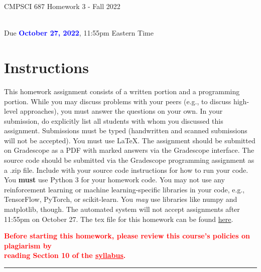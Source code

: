 \documentclass{article}
\newcommand{\TODO}[1]{\textcolor{blue}{\textbf{{#1}}}}
\newcommand{\WARNING}[1]{\textcolor{red}{\textbf{{#1}}}}
\begin{document}
\newpage
\begin{center}
    \begin{Large}
    CMPSCI 687 Homework 3 - Fall 2022 
    \end{Large}
    \\
    Due \TODO{October 27, 2022}, 11:55pm Eastern Time
\end{center}

\vspace{0.25in}

\section{Instructions}

This homework assignment consists of a written portion and a programming portion. While you may discuss problems with your peers (e.g., to discuss high-level approaches), you must answer the questions on your own. In your submission, do explicitly list all students with whom you discussed this assignment. Submissions must be typed (handwritten and scanned submissions will not be accepted). You must use \LaTeX. The assignment should be submitted on Gradescope as a PDF with marked answers via the Gradescope interface. The source code should be submitted via the Gradescope programming assignment as a .zip file. Include with your source code instructions for how to run your code. You \textbf{must} use Python 3 for your homework code. You may not use any reinforcement learning or machine learning-specific libraries in your code, e.g., TensorFlow, PyTorch, or scikit-learn. You \textit{may} use libraries like numpy and matplotlib, though. The automated system will not accept assignments after 11:55pm on October 27. The tex file for this homework can be found \href{https://people.cs.umass.edu/~bsilva/courses/CMPSCI_687/Fall2022/HWs/HW3_Source.zip}{here}.

\begin{center}
    \WARNING{Before starting this homework, please review this course's policies on plagiarism by  \\reading Section 10 of the \href{https://people.cs.umass.edu/~bsilva/courses/CMPSCI_687/Fall2022/F22_687_Syllabus_v2.pdf}{\textcolor{red}{\underline{syllabus}}}.}
\end{center}

\noindent\rule{\textwidth}{1pt}
\end{document}
